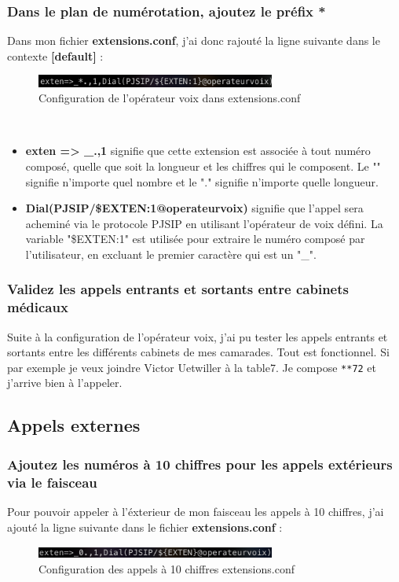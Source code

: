 \documentclass[12pt, a4paper]{article}
\begin{document}
	\subsubsection{Dans le plan de numérotation, ajoutez le préfix *}
	Dans mon fichier \textbf{extensions.conf}, j'ai donc rajouté la ligne suivante
	dans le contexte \textbf{[default]} :
	\begin{figure}[h]
		\centering
		\includegraphics[width=0.7\textwidth]{img/exten-op.png}
		\caption{Configuration de l'opérateur voix dans extensions.conf}
		\label{fig:op-ext}
	\end{figure}\\
	\begin{itemize}
		\item \textbf{exten => \_.,1} signifie que cette extension est associée à tout numéro composé, quelle que soit la longueur et les chiffres qui le composent. Le "" signifie n'importe quel nombre et le "." signifie n'importe quelle longueur.
		\item \textbf{Dial(PJSIP/\${EXTEN:1}@operateurvoix)} signifie que l'appel sera acheminé via le protocole PJSIP en utilisant l'opérateur de voix défini. La variable "\${EXTEN:1}" est utilisée pour extraire le numéro composé par l'utilisateur, en excluant le premier caractère qui est un "\_".
	\end{itemize}

	\subsubsection{Validez les appels entrants et sortants entre cabinets médicaux}
	Suite à la configuration de l'opérateur voix, j'ai pu tester les appels entrants et sortants entre les différents
	cabinets de mes camarades. Tout est fonctionnel. Si par exemple je veux joindre
	Victor Uetwiller à la table7. Je compose \texttt{**72} et j'arrive bien
	à l'appeler. 

	\subsection{Appels externes}
	\subsubsection{Ajoutez les numéros à 10 chiffres pour les appels extérieurs via le faisceau}
	Pour pouvoir appeler à l'éxterieur de mon faisceau les appels à 10 chiffres, j'ai ajouté la ligne
	suivante dans le fichier \textbf{extensions.conf} :
	\begin{figure}[h]
		\centering
		\includegraphics[width=0.7\textwidth]{img/externes.png}
		\caption{Configuration des appels à 10 chiffres extensions.conf}
		\label{fig:exter}
	\end{figure}\\
\end{document}
